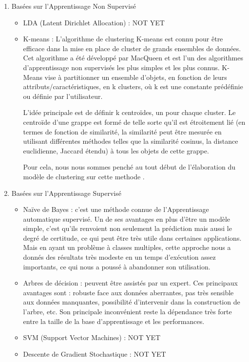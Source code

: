 \begin{enumerate}[leftmargin=*]
    \item{Basées sur l'Apprentissage Non Supervisé}
        \begin{itemize}
            \item{LDA (Latent Dirichlet Allocation) : }
            NOT YET
            \item{K-means : }
            L'algorithme de clustering K-means est connu pour être efficace dans la mise en place de cluster de grands ensembles de données. Cet algorithme a été développé par MacQueen et est l'un des algorithmes d'apprentissage non supervisés les plus simples et les plus connus. K-Means vise à partitionner un ensemble d'objets, en fonction de leurs attributs/caractéristiques, en k clusters, où k est une constante prédéfinie ou définie par l'utilisateur. 
        
            L'idée principale est de définir k centroïdes, un pour chaque cluster. Le centroïde d'une grappe est formé de telle sorte qu'il est étroitement lié (en termes de fonction de similarité, la similarité peut être mesurée en utilisant différentes méthodes telles que la similarité cosinus, la distance euclidienne, Jaccard étendu) à tous les objets de cette grappe.
        
            Pour cela, nous nous sommes penché au tout début de l'élaboration du modèle de clustering sur cette methode \cite{methodeKmeans}.
        \end{itemize}

    \item{Basées sur l'Apprentissage Supervisé}
        \begin{itemize}
            \item{Naïve de Bayes : }
            c'est une méthode connue de l'Apprentissage automatique supervisé. Un de ses avantages en plus d'être un modèle simple, c'est qu'ils renvoient non seulement la prédiction mais aussi le degré de certitude, ce qui peut être très utile dans certaines applications. Mais en ayant un problème à classes multiples, cette approche nous a donnés des résultats très modeste en un temps d'exécution assez importants, ce qui nous a poussé à abandonner son utilisation.\\
            
            \item{Arbres de décision : }
            peuvent être assistés par un expert. Ces principaux avantages sont : robuste face aux données aberrantes, pas très sensible aux données manquantes, possibilité d’intervenir dans la construction de l’arbre, etc. Son principale inconvénient reste la dépendance très forte entre la taille de la base d’apprentissage et les performances.\\
            
            \item{SVM (Support Vector Machines) : }
            NOT YET
            \item{Descente de Gradient Stochastique : }
            NOT YET
        \end{itemize}
\end{enumerate}

